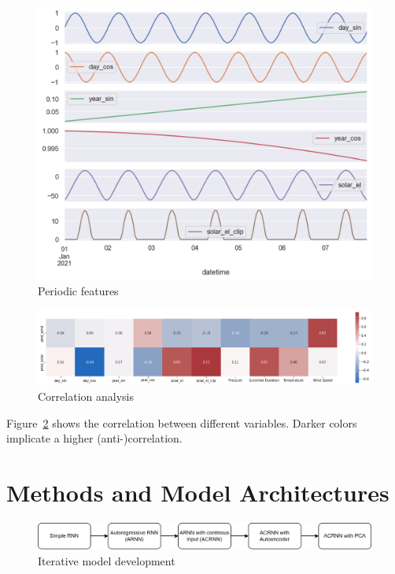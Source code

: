 \documentclass[11pt,table]{article}
\begin{document}
\begin{figure}[H]
	\centering
	\includegraphics[scale=0.7]{Figures/timeSignal.png}
	\caption{Periodic features}
	\label{fig:timeSignal}
\end{figure}

\begin{figure}[H]
	\centering
	\includegraphics[scale=1]{Figures/correlation.png}
	\caption{Correlation analysis}
	\label{fig:correlation}
\end{figure}

Figure~\ref{fig:correlation} shows the correlation between different variables. Darker colors implicate a higher (anti-)correlation. 


\section{Methods and Model Architectures}
\begin{figure}[H]
	\centering
	\includegraphics[scale=1]{Figures/modelEvolution.png}
	\caption{Iterative model development}
	\label{fig:modelEvo}
\end{figure}
\end{document}
